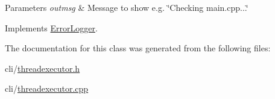 \begin{DoxyParams}{Parameters}
{\em outmsg} & Message to show e.\-g. \char`\"{}\-Checking main.\-cpp...\char`\"{} \\
\hline
\end{DoxyParams}


Implements \hyperlink{class_error_logger_aeb9c56add35e46cd83e9b7e92e5e110c}{Error\-Logger}.



The documentation for this class was generated from the following files\-:\begin{DoxyCompactItemize}
\item 
cli/\hyperlink{threadexecutor_8h}{threadexecutor.\-h}\item 
cli/\hyperlink{threadexecutor_8cpp}{threadexecutor.\-cpp}\end{DoxyCompactItemize}
